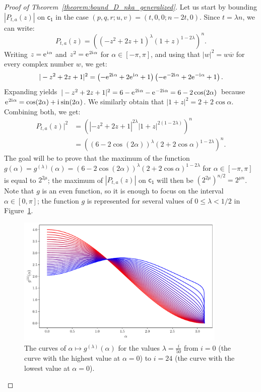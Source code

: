 \documentclass[runningheads,orivec]{llncs}
\newcommand{\dis}{\mathsf{c_1}}
\newcommand{\ee}{\mathrm e\mkern1mu}
\newcommand{\ii}{\mathrm i\mkern1mu}
\let\leq=\leqslant
\begin{document}
\begin{proof}[Proof of Theorem~\ref{theorem:bound_D_nka_generalized}]
        Let us start by bounding $|P_{t,a}(z)|$ on $\dis$ in the case $(p,q,r;u,v)=(t,0,0;n-2t,0)$. Since $t=\lambda n$, we can write:
        \[
            P_{t,a}(z)=\left((-z^2+2z+1)^{\lambda}(1+z)^{1-2\lambda}\right)^n.
        \]
        Writing $z=\ee^{\ii\alpha}$ and $z^2=\ee^{2\ii\alpha}$ for $\alpha\in[-\pi,\pi]$, and using that $|w|^2=w\overline w$ for every complex number $w$, we get:
        \[
            |-z^2+2z+1|^2=\left(-\ee^{2\ii\alpha}+2\ee^{\ii\alpha}+1\right)\left(-\ee^{-2\ii\alpha}+2\ee^{-\ii\alpha}+1\right).
        \]
        Expanding yields $|-z^2+2z+1|^2=6-\ee^{2\ii\alpha}-\ee^{-2\ii\alpha}=6-2\cos(2\alpha)$ because $\ee^{2\ii\alpha}=\cos(2\alpha)+\ii\sin(2\alpha)$. We similarly obtain that $|1+z|^2=2+2\cos\alpha$. Combining both, we get:
    	\begin{align*}
    		P_{t,a}(z)|^2&=\left(\left|-z^2+2z+1\right|^{2\lambda}|1+z|^{2(1-2\lambda)}\right)^n\\
    		&=\left((6-2\cos(2\alpha))^\lambda(2+2\cos\alpha)^{1-2\lambda}\right)^n.
    	\end{align*}
        The goal will be to prove that the maximum of the function $g(\alpha)=g^{(\lambda)}(\alpha)=(6-2\cos(2\alpha))^\lambda(2+2\cos\alpha)^{1-2\lambda}$ for $\alpha\in[-\pi,\pi]$ is equal to $2^{2\mu}$; the maximum of $|P_{t,a}(z)|$ on $\dis$ will then be $\left(2^{2\mu}\right)^{n/2}=2^{\mu n}$. Note that $g$ is an even function, so it is enough to focus on the interval $\alpha\in[0,\pi]$; the function $g$ is represented for several values of $0\leq\lambda<1/2$ in Figure~\ref{fig:family_curves_g}.
    
        \begin{figure}
        	\centering
        	\includegraphics[width=10cm]{graphs/family_curves_g.pdf}
        	\caption{The curves of $\alpha\mapsto g^{(\lambda)}(\alpha)$ for the values $\lambda=\frac{i}{50}$ from $i=0$ (the curve with the highest value at $\alpha=0$) to $i=24$ (the curve with the lowest value at $\alpha=0$).}
        	\label{fig:family_curves_g}
        \end{figure}
        

\end{proof}
\end{document}
